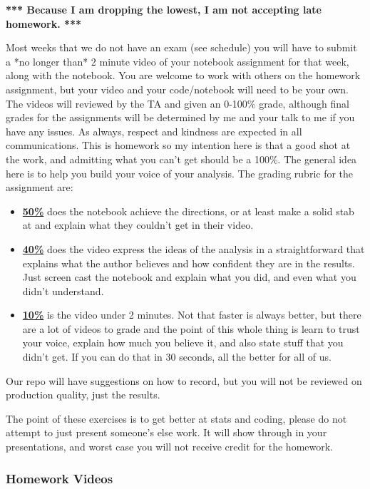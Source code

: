 \documentclass[11pt]{article}
\begin{document}
\textbf{*** Because I am dropping the lowest, I am not accepting late homework. ***}


Most weeks that we do not have an exam (see schedule) you will have to submit a *no longer than* 2 minute video of your notebook assignment for that week, along with the notebook. You are welcome to work with others on the homework assignment, but your video and your code/notebook will need to be your own. The videos will reviewed by the TA and given an 0-100\% grade, although final grades for the assignments will be determined by me and your talk to me if you have any issues. As always, respect and kindness are expected in all communications. This is homework so my intention here is that a good shot at the work, and admitting what you can't get should be a 100\%. The general idea here is to help you build your voice of your analysis. The grading rubric for the assignment are:
  \begin{itemize}
\item \underline{\textbf{50\%}} does the notebook achieve the directions, or at least make a solid stab at and explain what they couldn't get in their video.  
	\item \underline{\textbf{40\%}} does the video express the ideas of the analysis in a straightforward that explains what the author believes and how confident they are in the results. Just screen cast the notebook and explain what you did, and even what you didn't understand. 
\item \underline{\textbf{10\%}} is the video under 2 minutes. Not that faster is always better, but there are a lot of videos to grade and the point of this whole thing is learn to trust your voice, explain how much you believe it, and also state stuff that you didn't get. If you can do that in 30 seconds, all the better for all of us.   
\end{itemize}

Our repo will have suggestions on how to record, but you will not be reviewed on production quality, just the results. 

The point of these exercises is to get better at stats and coding, please do not attempt to just present someone's else work. It will show through in your presentations, and worst case you will not receive credit for the homework. 



\subsubsection*{Homework Videos}
\end{document}
